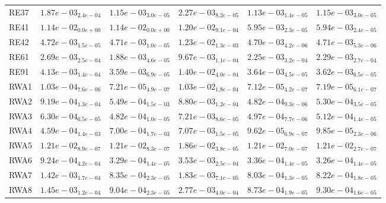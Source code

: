 \documentclass{article}
\begin{document}
\begin{table}
\begin{scriptsize}
\begin{tabular}{llllll}
RE37 & $  1.87e-03_{ 2.4e-04}$ & $  1.15e-03_{ 3.0e-05}$ & $  2.27e-03_{ 8.2e-05}$ & \cellcolor{gray95}$  1.13e-03_{ 1.4e-05}$ & \cellcolor{gray25}$  1.15e-03_{ 3.0e-05}$ \\
RE41 & $  1.14e-02_{ 0.0e+00}$ & $  1.14e-02_{ 0.0e+00}$ & $  1.20e-02_{ 9.1e-04}$ & \cellcolor{gray25}$  5.95e-03_{ 2.3e-05}$ & \cellcolor{gray95}$  5.94e-03_{ 2.4e-05}$ \\
RE42 & $  4.72e-03_{ 1.5e-05}$ & $  4.71e-03_{ 1.0e-05}$ & $  1.23e-02_{ 1.3e-03}$ & \cellcolor{gray95}$  4.70e-03_{ 4.2e-06}$ & \cellcolor{gray25}$  4.71e-03_{ 5.3e-06}$ \\
RE61 & $  2.69e-03_{ 2.5e-04}$ & \cellcolor{gray95}$  1.88e-03_{ 4.6e-05}$ & $  9.67e-03_{ 1.1e-04}$ & \cellcolor{gray25}$  2.25e-03_{ 3.2e-04}$ & $  2.29e-03_{ 2.7e-04}$ \\
RE91 & $  4.13e-03_{ 1.4e-04}$ & \cellcolor{gray95}$  3.59e-03_{ 6.9e-05}$ & $  1.40e-02_{ 4.0e-04}$ & $  3.64e-03_{ 4.5e-05}$ & \cellcolor{gray25}$  3.62e-03_{ 6.5e-05}$ \\
RWA1 & $  1.03e-04_{ 7.6e-06}$ & $  7.21e-05_{ 4.9e-07}$ & $  1.03e-02_{ 1.8e-04}$ & \cellcolor{gray95}$  7.12e-05_{ 4.2e-07}$ & \cellcolor{gray25}$  7.19e-05_{ 6.1e-07}$ \\
RWA2 & $  9.19e-04_{ 1.3e-04}$ & $  5.49e-04_{ 1.5e-03}$ & $  8.80e-03_{ 1.2e-04}$ & \cellcolor{gray95}$  4.82e-04_{ 9.3e-06}$ & \cellcolor{gray25}$  5.30e-04_{ 3.5e-05}$ \\
RWA3 & $  6.30e-04_{ 6.5e-05}$ & \cellcolor{gray95}$  4.82e-04_{ 1.0e-05}$ & $  7.21e-03_{ 8.6e-05}$ & \cellcolor{gray25}$  4.97e-04_{ 7.7e-06}$ & $  5.12e-04_{ 1.4e-05}$ \\
RWA4 & $  4.59e-04_{ 1.4e-03}$ & $  7.00e-04_{ 1.7e-03}$ & $  7.07e-03_{ 1.5e-05}$ & \cellcolor{gray95}$  9.62e-05_{ 6.9e-07}$ & \cellcolor{gray25}$  9.85e-05_{ 2.3e-06}$ \\
RWA5 & $  1.21e-02_{ 8.9e-07}$ & \cellcolor{gray25}$  1.21e-02_{ 8.3e-07}$ & $  1.86e-02_{ 3.8e-05}$ & $  1.21e-02_{ 7.0e-07}$ & \cellcolor{gray95}$  1.21e-02_{ 2.7e-07}$ \\
RWA6 & $  9.24e-04_{ 4.2e-04}$ & \cellcolor{gray25}$  3.29e-04_{ 1.4e-05}$ & $  3.53e-03_{ 2.5e-04}$ & $  3.36e-04_{ 1.4e-05}$ & \cellcolor{gray95}$  3.26e-04_{ 1.4e-05}$ \\
RWA7 & $  1.42e-03_{ 1.7e-04}$ & $  8.35e-04_{ 2.3e-05}$ & $  1.83e-03_{ 7.1e-05}$ & \cellcolor{gray95}$  8.03e-04_{ 1.3e-05}$ & \cellcolor{gray25}$  8.22e-04_{ 1.8e-05}$ \\
RWA8 & $  1.45e-03_{ 1.2e-04}$ & \cellcolor{gray25}$  9.04e-04_{ 2.3e-05}$ & $  2.77e-03_{ 4.0e-04}$ & \cellcolor{gray95}$  8.73e-04_{ 1.9e-05}$ & $  9.30e-04_{ 1.6e-05}$ \\

\end{tabular}
\end{scriptsize}
\end{table}
\end{document}
